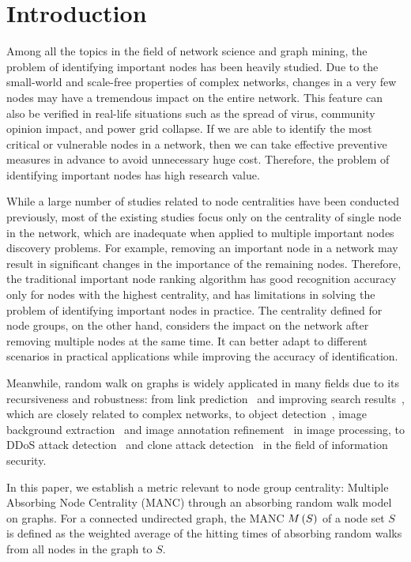 \documentclass[sigconf]{acmart}
\begin{document}
\section{Introduction}\label{sec:intro}

Among all the topics in the field of network science and graph mining, the problem of identifying important nodes has been heavily studied.
Due to the small-world and scale-free properties of complex networks, changes in a very few nodes may have a tremendous impact on the entire network.
This feature can also be verified in real-life situations such as the spread of virus, community opinion impact, and power grid collapse.
If we are able to identify the most critical or vulnerable nodes in a network, then we can take effective preventive measures in advance to avoid unnecessary huge cost.
Therefore, the problem of identifying important nodes has high research value.

While a large number of studies related to node centralities have been conducted previously, most of the existing studies focus only on the centrality of single node in the network, which are inadequate when applied to multiple important nodes discovery problems.
For example, removing an important node in a network may result in significant changes in the importance of the remaining nodes.
Therefore, the traditional important node ranking algorithm has good recognition accuracy only for nodes with the highest centrality, and has limitations in solving the problem of identifying important nodes in practice.
The centrality defined for node groups, on the other hand, considers the impact on the network after removing multiple nodes at the same time.
It can better adapt to different scenarios in practical applications while improving the accuracy of identification.

Meanwhile, random walk on graphs is widely applicated in many fields due to its recursiveness and robustness: from link prediction~\cite{YiGuWeTiHa10} and improving search results~\cite{LiPeMaQiWeQi10}, which are closely related to complex networks, to object detection~\cite{GoViHuRa10}, image background extraction~\cite{HuWaYeChLa16} and image annotation refinement~\cite{WaJiZhZh10} in image processing, to DDoS attack detection~\cite{XuZhXiYu14} and clone attack detection~\cite{ZeCaZhGuXi10} in the field of information security.

In this paper, we establish a metric relevant to node group centrality: Multiple Absorbing Node Centrality (MANC) through an absorbing random walk model on graphs.
For a connected undirected graph, the MANC \(M\left(S\right)\) of a node set \(S\) is defined as the weighted average of the hitting times of absorbing random walks from all nodes in the graph to \(S\).
\end{document}
